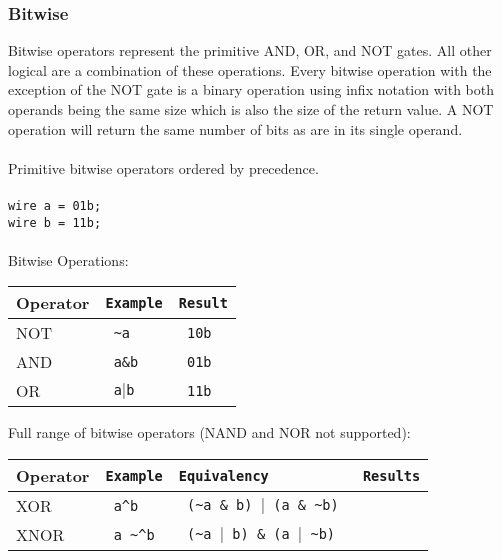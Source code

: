 \documentclass[letterpaper,11pt]{article}
\begin{document}
        \subsubsection{Bitwise}
        Bitwise operators represent the primitive AND, OR, and NOT gates. All other logical are a combination 
        of these operations. Every bitwise operation with the exception of the NOT gate is a binary operation 
        using infix notation with both operands being the same size which is also the 
        size of the return value. A NOT operation will return the same number of bits as are in its single operand. \\\\
        Primitive bitwise operators ordered by precedence. \\\\
        \texttt{wire a = 01b;} \\
        \texttt{wire b = 11b;} \\\\
        Bitwise Operations: \\
        
        \begin{center}
        \begin{tabular}{|l|>{\texttt\bgroup}l<{\egroup}|>{\texttt\bgroup}l<{\egroup}|}
        \hline
        Operator&Example&Result\\ \hline
        NOT		&	\textasciitilde a		&	10b\\ \hline
        AND		&	a\&b		&	01b\\ \hline
        OR		&	a$\mid$b	&	11b\\ \hline
        \end{tabular}
        \end{center} 
        Full range of bitwise operators (NAND and NOR not supported): \\
         
        \begin{center} 
        \begin{tabular}{|l|>{\texttt\bgroup}l<{\egroup}|>{\texttt\bgroup}l<{\egroup}|>{\texttt\bgroup}l<{\egroup}|}
        \hline
        Operator&Example&Equivalency&Results\\ \hline
        XOR		&	a\textasciicircum b	&	(\textasciitilde a \& b) $\mid$ (a \& \textasciitilde b)		&			\\ \hline
        XNOR	&	a \textasciitilde \textasciicircum b 	&	(\textasciitilde a $\mid$ b) \& (a $\mid$ \textasciitilde b) 	& 			\\ \hline
        \end{tabular}
        \end{center} 
        
\end{document}
